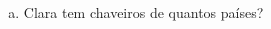\documentclass[a4paper,14pt]{article}
\begin{document}
\begin{multicols}{2}
\begin{enumerate}
\begin{enumerate}[a)]
				\item Clara tem chaveiros de quantos países? \\\\\\\\\\\\\\\\
			\end{enumerate}
		\end{enumerate}
		$~$ \\ $~$ \\ $~$ \\ $~$ \\ $~$ \\ $~$ \\ $~$ \\ $~$ \\ $~$ \\ $~$ \\ $~$ \\ $~$ \\ $~$ \\ $~$ \\ $~$ \\ $~$ \\ $~$ \\ $~$ \\ $~$ \\ $~$ \\ $~$ \\ $~$ \\ $~$ \\ $~$ \\ $~$ \\ $~$ \\ $~$ \\ $~$ \\ $~$ \\ $~$ \\
	\end{multicols}
\end{document}
